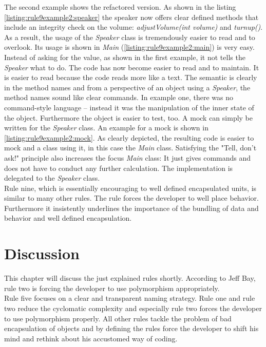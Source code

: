 The second example shows the refactored version. As shown in the listing \ref{listing:rule9example2:speaker} the speaker now offers clear defined methods that include an integrity check on the volume: \textit{adjustVolume(int volume)} and \textit{turnup()}. As a result, the usage of the \textit{Speaker} class is tremendously easier to read and to overlook. Its usage is shown in \textit{Main} (\ref{listing:rule9example2:main}) is very easy. 
\\

Instead of asking for the value, as shown in the first example, it not tells the \textit{Speaker} what to do. The code has now become easier to read and to maintain. It is easier to read because the code reads more like a text. The semantic is clearly in the method names and from a perspective of an object using a \textit{Speaker}, the method names sound like clear commands. In example one, there was no command-style language -- instead it was the manipulation of the inner state of the object. Furthermore the object is easier to test, too. A mock can simply be written for the \textit{Speaker} class. An example for a mock is shown in \ref{listing:rule9example2:mock}. As clearly depicted, the resulting code is easier to mock and a class using it, in this case the \textit{Main} class. Satisfying the "Tell, don't ask!" principle also increases the focus \textit{Main} class: It just gives commands and does not have to conduct any further calculation. The implementation is delegated to the \textit{Speaker} class. 
\\

Rule nine, which is essentially encouraging to well defined encapsulated units, is similar to many other rules. The rule forces the developer to well place behavior. Furthermore it insistently underlines the importance of the bundling of data and behavior and well defined encapsulation. 

\section{Discussion}
\label{d:discussion}
This chapter will discuss the just explained rules shortly. According to Jeff Bay, rule two is forcing the developer to use polymorphism appropriately. 
\\

Rule five focuses on a clear and transparent naming strategy. Rule one and rule two reduce the cyclomatic complexity and especially rule two forces the developer to use polymorphism properly. All other rules tackle the problem of bad encapsulation of objects and by defining the rules force the developer to shift his mind and rethink about his accustomed way of coding. 
\\

